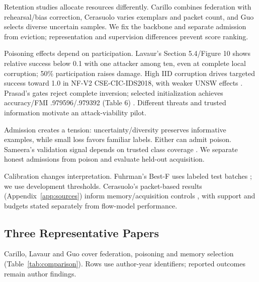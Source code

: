 \documentclass[10pt,a4paper]{article}
\begin{document}
Retention studies allocate resources differently. Carillo combines federation with rehearsal/bias correction, Cerasuolo varies exemplars and packet count, and Guo selects diverse uncertain samples. We fix the backbone and separate admission from eviction; representation and supervision differences prevent score ranking.

Poisoning effects depend on participation. Lavaur's Section 5.4/Figure 10 shows relative success below 0.1 with one attacker among ten, even at complete local corruption; 50\% participation raises damage. High IID corruption drives targeted success toward 1.0 in NF-V2 CSE-CIC-IDS2018, with weaker UNSW effects \cite{lavaur}. Prasad's gates reject complete inversion; selected initialization achieves accuracy/FMI .979596/.979392 (Table 6) \cite{ensemble}. Different threats and trusted information motivate an attack-viability pilot.

Admission creates a tension: uncertainty/diversity preserves informative examples, while small loss favors familiar labels. Either can admit poison. Sameera's validation signal depends on trusted class coverage \cite{wei}. We separate honest admissions from poison and evaluate held-out acquisition.

Calibration changes interpretation. Fuhrman's Best-F uses labeled test batches \cite{cnd}; we use development thresholds. Cerasuolo's packet-based results (Appendix~\ref{app:sources}) inform memory/acquisition controls \cite{cerasuolo}, with support and budgets stated separately from flow-model performance.

\subsection{Three Representative Papers}
Carillo, Lavaur and Guo cover federation, poisoning and memory selection (Table~\ref{tab:comparison}). Rows use author-year identifiers; reported outcomes remain author findings.
\end{document}
